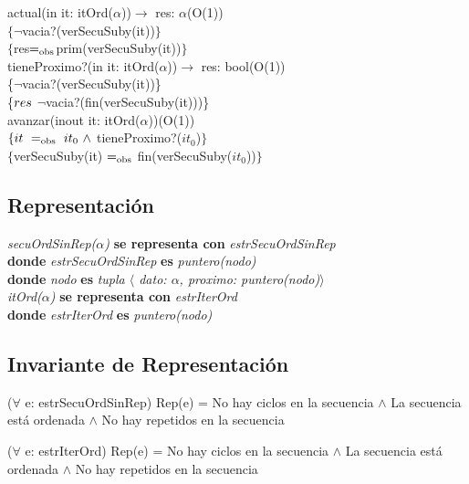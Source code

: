 actual(in it: itOrd($\alpha$))$\longrightarrow$ res: $\alpha$\hfill (O(1))\\
$\{\neg$vacia?(verSecuSuby(it))$\}$\\
$\{ $res$ =_{\mathrm{obs}} $prim(verSecuSuby(it))$\}$\\

tieneProximo?(in it: itOrd($\alpha$))$\longrightarrow$ res: bool\hfill (O(1))\\
\{$\neg$vacia?(verSecuSuby(it))\}\\
\{${res}$ \igobs $\neg$vacia?(fin(verSecuSuby(it)))\}\\

avanzar(inout it: itOrd($\alpha$))\hfill (O(1))\\
$\{\sombreritoWide{it}\ \igobs\ it_0\ \wedge$ tieneProximo?($it_0$)$\}$\\
$\{$verSecuSuby(it) $=_{\mathrm{obs}}$ fin(verSecuSuby($it_0$))$\}$\\


\subsection*{Representaci\'on}
\textit{secuOrdSinRep($\alpha$)} \textbf{se representa con} \textit{estrSecuOrdSinRep}\\
\textbf{donde} \textit{estrSecuOrdSinRep} \textbf{es} \textit{puntero(nodo)}\\
\textbf{donde} \textit{nodo} \textbf{es} \textit{tupla $\langle$ dato: $\alpha$, proximo: puntero(nodo)$\rangle$}\\

\textit{itOrd($\alpha$)} \textbf{se representa con} \textit{estrIterOrd}\\
\textbf{donde} \textit{estrIterOrd} \textbf{es} \textit{puntero(nodo)}\\

\subsection*{Invariante de Representaci\'on}
\vspace{11pt}
($\forall$ e: estrSecuOrdSinRep) Rep(e) = No hay ciclos en la secuencia $\wedge$ La secuencia est\'a ordenada $\wedge$ No hay repetidos en la secuencia

\vspace{22pt}

\vspace{11pt}
($\forall$ e: estrIterOrd) Rep(e) = No hay ciclos en la secuencia $\wedge$ La secuencia est\'a ordenada $\wedge$ No hay repetidos en la secuencia

